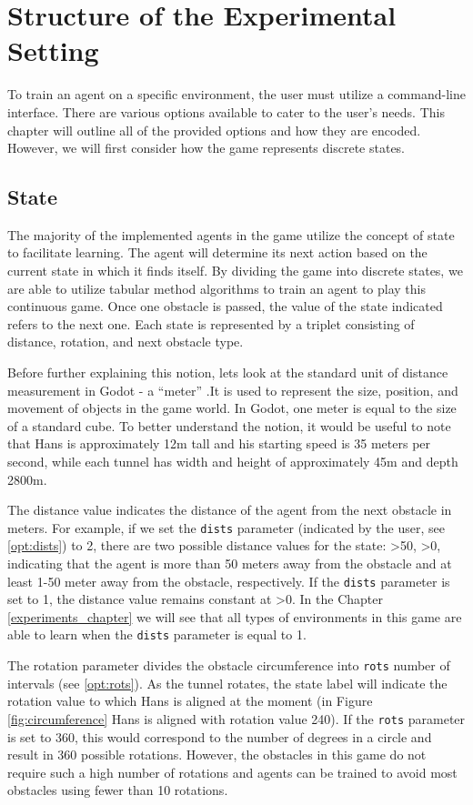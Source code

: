 \chapter{Structure of the Experimental Setting}
\label{agent_code_chapter}
To train an agent on a specific environment, the user must utilize a command-line interface. There are various options available to cater to the user's needs. This chapter will outline all of the provided options and how they are encoded. However, we will first consider how the game represents discrete states.

\section{State}
The majority of the implemented agents in the game utilize the concept of state to facilitate learning. The agent will determine its next action based on the current state in which it finds itself. By dividing the game into discrete states, we are able to utilize tabular method algorithms to train an agent to play this continuous game. Once one obstacle is passed, the value of the state indicated refers to the next one. Each state is represented by a triplet consisting of distance, rotation, and next obstacle type. 

Before further explaining this notion, lets look at the standard unit of distance measurement in Godot - a ``meter'' .It is used to represent the size, position, and movement of objects in the game world. In Godot, one meter is equal to the size of a standard cube. To better understand the notion, it would be useful to note that Hans is approximately 12m tall and his starting speed is 35 meters per second, while each tunnel has width and height of approximately 45m and depth 2800m.

The distance value indicates the distance of the agent from the next obstacle in meters. For example, if we set the \texttt{dists} parameter (indicated by the user, see \ref{opt:dists}) to 2, there are two possible distance values for the state: \textgreater 50, \textgreater 0, indicating that the agent is more than 50 meters away from the obstacle and at least 1-50 meter away from the obstacle, respectively. If the \texttt{dists} parameter is set to 1, the distance value remains constant at \textgreater 0. In the Chapter \ref{experiments_chapter} we will see that all types of environments in this game are able to learn when the \texttt{dists} parameter is equal to 1.  

The rotation parameter divides the obstacle circumference into \texttt{rots} number of intervals (see \ref{opt:rots}). As the tunnel rotates, the state label will indicate the rotation value to which Hans is aligned at the moment (in Figure \ref{fig:circumference} Hans is aligned with rotation value 240). If the \texttt{rots} parameter is set to 360, this would correspond to the number of degrees in a circle and result in 360 possible rotations. However, the obstacles in this game do not require such a high number of rotations and agents can be trained to avoid most obstacles using fewer than 10 rotations. 

